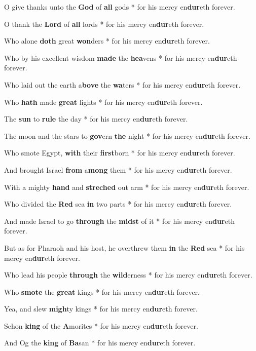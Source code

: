 \begin{multicols}{2}
	O give thanks unto the \textbf{God} of \textbf{all} gods * for his mercy en\textbf{dur}eth forever.
	
	O thank the \textbf{Lord} of \textbf{all} lords * for his mercy en\textbf{dur}eth forever.
	
	Who alone \textbf{doth} great \textbf{won}ders * for his mercy en\textbf{dur}eth forever.
	
	Who by his excellent wisdom \textbf{made} the \textbf{hea}vens * for his mercy en\textbf{dur}eth forever.
	
	Who laid out the earth a\textbf{bove} the \textbf{wa}ters * for his mercy en\textbf{dur}eth forever.
	
	Who \textbf{hath} made \textbf{great} lights * for his mercy en\textbf{dur}eth forever.
	
	The \textbf{sun} to \textbf{rule} the day * for his mercy en\textbf{dur}eth forever.
	
	The moon and the stars to \textbf{gov}ern \textbf{the} night * for his mercy en\textbf{dur}eth forever.
	
	Who smote Egypt, \textbf{with} their \textbf{first}born * for his mercy en\textbf{dur}eth forever.
	
	And brought Israel \textbf{from} a\textbf{mong} them * for his mercy en\textbf{dur}eth forever.
	
	With a mighty \textbf{hand} and \textbf{streched} out arm * for his mercy en\textbf{dur}eth forever.
	
	Who divided the \textbf{Red} sea \textbf{in} two parts * for his mercy en\textbf{dur}eth forever.
	
	And made Israel to go \textbf{through} the \textbf{midst} of it * for his mercy en\textbf{dur}eth forever.
	
	But as for Pharaoh and his host, he overthrew them \textbf{in} the \textbf{Red} sea * for his mercy en\textbf{dur}eth forever.
	
	Who lead his people \textbf{through} the \textbf{wild}erness * for his mercy en\textbf{dur}eth forever.
	
	Who \textbf{smote} the \textbf{great} kings * for his mercy en\textbf{dur}eth forever.
	
	Yea, and slew \textbf{migh}ty kings * for his mercy en\textbf{dur}eth forever.
	
	Sehon \textbf{king} of the \textbf{A}morites * for his mercy en\textbf{dur}eth forever.
	
	And Og the \textbf{king} of \textbf{Ba}san * for his mercy en\textbf{dur}eth forever.
	

\end{multicols}
